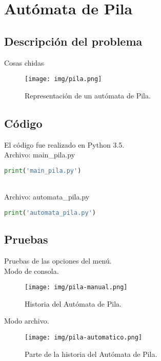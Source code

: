 \section{Autómata de Pila}
	\subsection{Descripción del problema}
	Cosas chidas
	\begin{figure}[H]
		\begin{center}
		\texttt{[image: img/pila.png]}
		\caption{Representación de un autómata de Pila.}
		\label{fig:diagrama-pila}
		\end{center}
	\end{figure}
	\subsection{Código}
	El código fue realizado en Python 3.5.
	\\Archivo: main\_pila.py
	\begin{lstlisting}[language=Python]
	print('main_pila.py')
	\end{lstlisting}
	\\Archivo: automata\_pila.py
	\begin{lstlisting}[language=Python]
	print('automata_pila.py')
	\end{lstlisting}
	\subsection{Pruebas}
	Pruebas de las opciones del menú.
	\\
	{\large Modo de consola.}
	\begin{figure}[H]
		\begin{center}
			\texttt{[image: img/pila-manual.png]}
			\caption{Historia del Autómata de Pila.}
			\label{fig:pila1}
		\end{center}
	\end{figure}
	{\large Modo archivo.}
	\begin{figure}[H]
		\begin{center}
			\texttt{[image: img/pila-automatico.png]}
			\caption{Parte de la historia del Autómata de Pila.}
			\label{fig:pila2}
		\end{center}
	\end{figure}